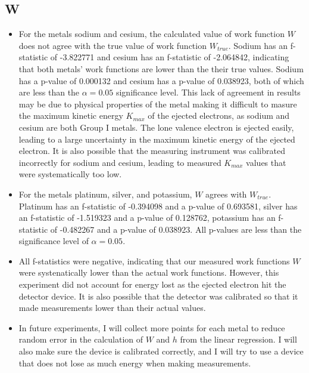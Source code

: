 \documentclass{article}
\begin{document}
\subsection{W}
\begin{itemize}
\item For the metals sodium and cesium, the calculated value of work function $W$ does not agree with the true value of work function $W_{true}$. Sodium has an f-statistic of -3.822771 and cesium has an f-statistic of -2.064842, indicating that both metals' work functions are lower than the their true values. Sodium has a p-value of 0.000132 and cesium has a p-value of 0.038923, both of which are less than the $\alpha = 0.05$ significance level. This lack of agreement in results may be due to physical properties of the metal making it difficult to masure the maximum kinetic energy $K_{max}$ of the ejected electrons, as sodium and cesium are both Group I metals. The lone valence electron is ejected easily, leading to a large uncertainty in the maximum kinetic energy of the ejected electron. It is also possible that the measuring instrument was calibrated incorrectly for sodium and cesium, leading to measured $K_{max}$ values that were systematically too low.
\item For the metals platinum, silver, and potassium, $W$ agrees with $W_{true}$. Platinum has an f-statistic of -0.394098 and a p-value of 0.693581, silver has an f-statistic of -1.519323 and a p-value of 0.128762, potassium has an f-statistic of -0.482267 and a p-value of 0.038923. All p-values are less than the significance level of $\alpha = 0.05$.
\item All f-statistics were negative, indicating that our measured work functions $W$ were systenatically lower than the actual work functions. However, this experiment did not account for energy lost as the ejected electron hit the detector device. It is also possible that the detector was calibrated so that it made measurements lower than their actual values.
\item In future experiments, I will collect more points for each metal to reduce random error in the calculation of $W$ and $h$ from the linear regression. I will also make sure the device is calibrated correctly, and I will try to use a device that does not lose as much energy when making measurements.
\end{itemize}
\end{document}
